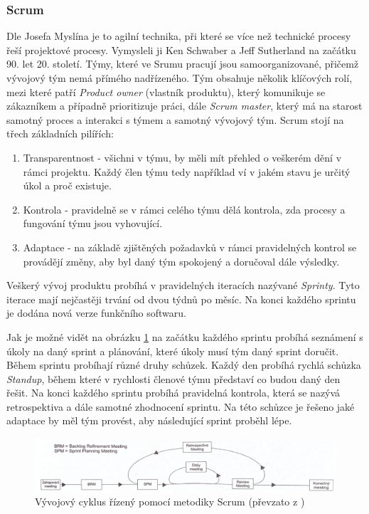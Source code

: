 \documentclass[czech,master,public,dept460,male,cpdeclaration,oneside]{diploma}
\begin{document}
\subsubsection{Scrum}
Dle Josefa Myslína \cite{ref:scrum_myslin} je to agilní technika, při které se více než technické procesy řeší projektové procesy. Vymysleli ji Ken Schwaber a Jeff Sutherland na začátku 90. let 20. století. Týmy, které ve Srumu pracují jsou samoorganizované, přičemž vývojový tým nemá přímého nadřízeného. Tým obsahuje několik klíčových rolí, mezi které patří \textit{Product owner} (vlastník produktu), který komunikuje se zákazníkem a případně prioritizuje práci, dále \textit{Scrum master}, který má na starost samotný proces a interakci s týmem a samotný vývojový tým. Scrum stojí na třech základních pilířích: 

\begin{enumerate}
\item Transparentnost - všichni v týmu, by měli mít přehled o veškerém dění v rámci projektu. Každý člen týmu tedy například ví v jakém stavu je určitý úkol a proč existuje.
\item Kontrola - pravidelně se v rámci celého týmu dělá kontrola, zda procesy a fungování týmu jsou vyhovující.
\item Adaptace - na základě zjištěných požadavků v rámci pravidelných kontrol se provádějí změny, aby byl daný tým spokojený a doručoval dále výsledky.
\end{enumerate}

Veškerý vývoj produktu probíhá v pravidelných iteracích nazývané \textit{Sprinty}. Tyto iterace mají nejčastěji trvání od dvou týdnů po měsíc. Na konci každého sprintu je dodána nová verze funkčního softwaru. 

Jak je možné vidět na obrázku \ref{fig:scrum_cyklus} na začátku každého sprintu probíhá seznámení s úkoly na daný sprint a plánování, které úkoly musí tým daný sprint doručit. Během sprintu probíhají různé druhy schůzek. Každý den probíhá rychlá schůzka \textit{Standup}, během které v rychlosti členové týmu představí co budou daný den řešit. Na konci každého sprintu probíhá pravidelná kontrola, která se nazývá retrospektiva a dále samotné zhodnocení sprintu. Na této schůzce je řešeno jaké adaptace by měl tým provést, aby následující sprint proběhl lépe. 

\begin{figure}[!ht]
    \centering
    \includegraphics[width=1\textwidth]{Diplomka/Figures/scrum.png}
    \caption{Vývojový cyklus řízený pomocí metodiky Scrum (převzato z \cite{ref:scrum_myslin_cyklus_img})}
    \label{fig:scrum_cyklus}
\end{figure}
\end{document}
